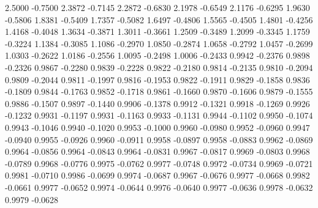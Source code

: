     2.5000   -0.7500
    2.3872   -0.7145
    2.2872   -0.6830
    2.1978   -0.6549
    2.1176   -0.6295
    1.9630   -0.5806
    1.8381   -0.5409
    1.7357   -0.5082
    1.6497   -0.4806
    1.5565   -0.4505
    1.4801   -0.4256
    1.4168   -0.4048
    1.3634   -0.3871
    1.3011   -0.3661
    1.2509   -0.3489
    1.2099   -0.3345
    1.1759   -0.3224
    1.1384   -0.3085
    1.1086   -0.2970
    1.0850   -0.2874
    1.0658   -0.2792
    1.0457   -0.2699
    1.0303   -0.2622
    1.0186   -0.2556
    1.0095   -0.2498
    1.0006   -0.2433
    0.9942   -0.2376
    0.9898   -0.2326
    0.9867   -0.2280
    0.9839   -0.2228
    0.9822   -0.2180
    0.9814   -0.2135
    0.9810   -0.2094
    0.9809   -0.2044
    0.9811   -0.1997
    0.9816   -0.1953
    0.9822   -0.1911
    0.9829   -0.1858
    0.9836   -0.1809
    0.9844   -0.1763
    0.9852   -0.1718
    0.9861   -0.1660
    0.9870   -0.1606
    0.9879   -0.1555
    0.9886   -0.1507
    0.9897   -0.1440
    0.9906   -0.1378
    0.9912   -0.1321
    0.9918   -0.1269
    0.9926   -0.1232
    0.9931   -0.1197
    0.9931   -0.1163
    0.9933   -0.1131
    0.9944   -0.1102
    0.9950   -0.1074
    0.9943   -0.1046
    0.9940   -0.1020
    0.9953   -0.1000
    0.9960   -0.0980
    0.9952   -0.0960
    0.9947   -0.0940
    0.9955   -0.0926
    0.9960   -0.0911
    0.9958   -0.0897
    0.9958   -0.0883
    0.9962   -0.0869
    0.9964   -0.0856
    0.9964   -0.0843
    0.9964   -0.0831
    0.9967   -0.0817
    0.9969   -0.0803
    0.9968   -0.0789
    0.9968   -0.0776
    0.9975   -0.0762
    0.9977   -0.0748
    0.9972   -0.0734
    0.9969   -0.0721
    0.9981   -0.0710
    0.9986   -0.0699
    0.9974   -0.0687
    0.9967   -0.0676
    0.9977   -0.0668
    0.9982   -0.0661
    0.9977   -0.0652
    0.9974   -0.0644
    0.9976   -0.0640
    0.9977   -0.0636
    0.9978   -0.0632
    0.9979   -0.0628